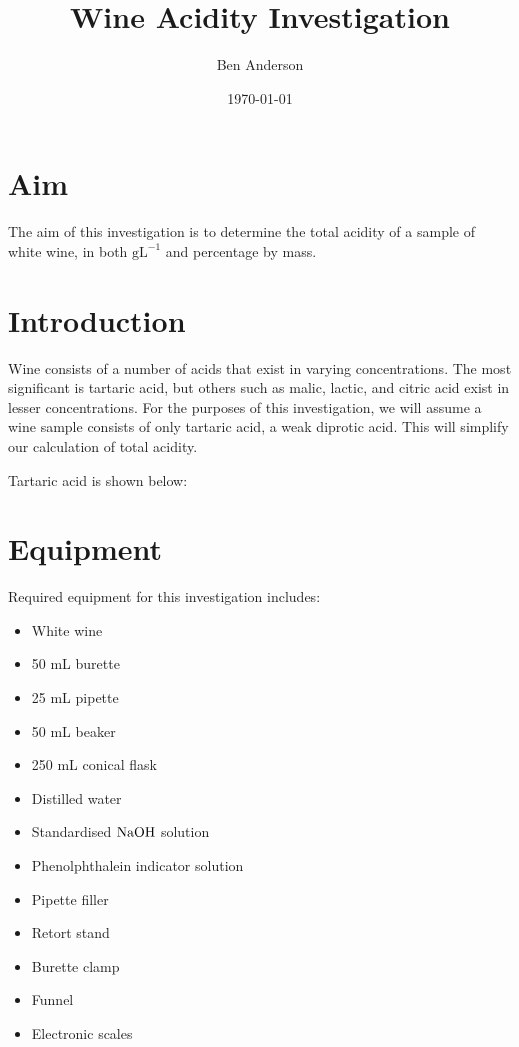 \documentclass[a4paper,11pt]{article}
\begin{document}
\title{Wine Acidity Investigation}
\author{Ben Anderson}
\date{\today}
\maketitle


\section{Aim}

The aim of this investigation is to determine the total acidity of a sample of
white wine, in both $\mbox{gL}^{-1}$ and percentage by mass.


\section{Introduction}

Wine consists of a number of acids that exist in varying concentrations. The
most significant is tartaric acid, but others such as malic, lactic, and citric
acid exist in lesser concentrations. For the purposes of this investigation, we
will assume a wine sample consists of only tartaric acid, a weak diprotic
acid. This will simplify our calculation of total acidity.

Tartaric acid is shown below:

\begin{center}
\end{center}


\section{Equipment}

Required equipment for this investigation includes:

\begin{itemize}
\item White wine
\item 50 mL burette
\item 25 mL pipette
\item 50 mL beaker
\item 250 mL conical flask
\item Distilled water
\item Standardised $\ce{NaOH}$ solution
\item Phenolphthalein indicator solution
\item Pipette filler
\item Retort stand
\item Burette clamp
\item Funnel
\item Electronic scales
\end{itemize}
\end{document}
